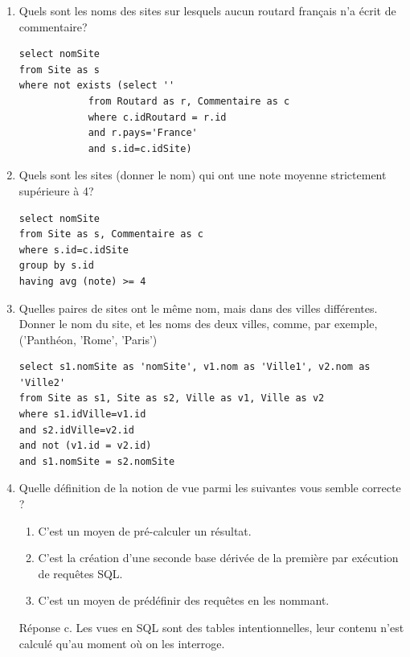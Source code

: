 \begin{enumerate}
\item Quels sont les noms des sites sur lesquels aucun routard français n'a écrit de commentaire? 

\begin{solution}
\begin{verbatim}
select nomSite
from Site as s
where not exists (select '' 
            from Routard as r, Commentaire as c
            where c.idRoutard = r.id
            and r.pays='France'
            and s.id=c.idSite)
\end{verbatim}
\end{solution}

\item Quels sont les sites (donner le nom) qui ont une note moyenne strictement supérieure à 4?

\begin{solution}
\begin{verbatim}
select nomSite
from Site as s, Commentaire as c
where s.id=c.idSite
group by s.id
having avg (note) >= 4
\end{verbatim}
\end{solution}


\item Quelles paires de sites ont le même nom, mais dans des villes différentes. Donner le nom du site, et
     les noms des deux villes, comme, par exemple, ('Panthéon, 'Rome', 'Paris')
 

\begin{solution}
\begin{verbatim}
select s1.nomSite as 'nomSite', v1.nom as 'Ville1', v2.nom as 'Ville2'
from Site as s1, Site as s2, Ville as v1, Ville as v2
where s1.idVille=v1.id
and s2.idVille=v2.id
and not (v1.id = v2.id)
and s1.nomSite = s2.nomSite
\end{verbatim}
\end{solution}

\item  Quelle définition de la notion de vue parmi les suivantes vous semble correcte ?

    \begin{enumerate}
        \item  C’est un moyen de pré-calculer un résultat.
       \item  C’est la création d'une seconde base dérivée de la première par exécution de requêtes SQL.
       \item C’est un moyen de prédéfinir des requêtes en les nommant.
\end{enumerate}


\begin{solution}
Réponse c. Les vues en SQL sont des tables intentionnelles, leur contenu n’est calculé qu’au moment où on les interroge. 
\end{solution}

\end{enumerate}

